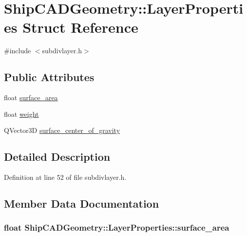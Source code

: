\hypertarget{structShipCADGeometry_1_1LayerProperties}{\section{Ship\-C\-A\-D\-Geometry\-:\-:Layer\-Properties Struct Reference}
\label{structShipCADGeometry_1_1LayerProperties}
}


{\ttfamily \#include $<$subdivlayer.\-h$>$}

\subsection*{Public Attributes}
\begin{DoxyCompactItemize}
\item 
float \hyperlink{structShipCADGeometry_1_1LayerProperties_aec92af25292b8dcfa668155a3e051dfb}{surface\-\_\-area}
\item 
float \hyperlink{structShipCADGeometry_1_1LayerProperties_a6905a3f5c097cc4f251455a6267c9db9}{weight}
\item 
Q\-Vector3\-D \hyperlink{structShipCADGeometry_1_1LayerProperties_aa30ff3a9afe247ba04327d79f4f398c4}{surface\-\_\-center\-\_\-of\-\_\-gravity}
\end{DoxyCompactItemize}


\subsection{Detailed Description}


Definition at line 52 of file subdivlayer.\-h.



\subsection{Member Data Documentation}
\hypertarget{structShipCADGeometry_1_1LayerProperties_aec92af25292b8dcfa668155a3e051dfb}{
\subsubsection[{surface\-\_\-area}]{\setlength{\rightskip}{0pt plus 5cm}float Ship\-C\-A\-D\-Geometry\-::\-Layer\-Properties\-::surface\-\_\-area}}\label{structShipCADGeometry_1_1LayerProperties_aec92af25292b8dcfa668155a3e051dfb}


